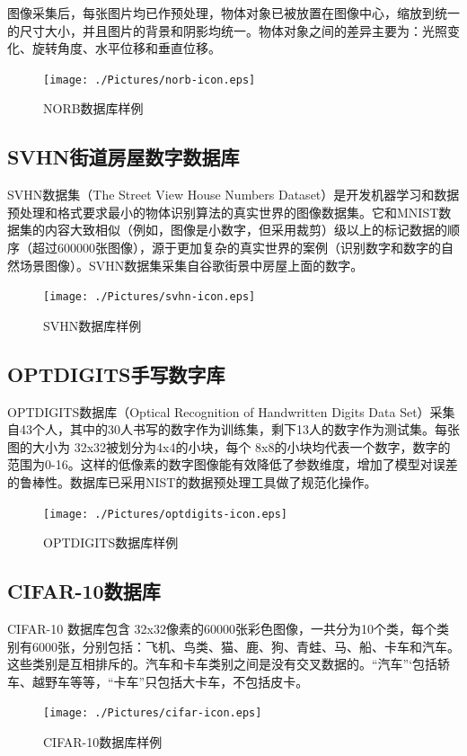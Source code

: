 \documentclass[oneside]{ZJUthesis}
\begin{document}
图像采集后，每张图片均已作预处理，物体对象已被放置在图像中心，缩放到统一的尺寸大小，并且图片的背景和阴影均统一。物体对象之间的差异主要为：光照变化、旋转角度、水平位移和垂直位移。
\begin{figure}[h]
\centering
\texttt{[image: ./Pictures/norb-icon.eps]}
\caption{NORB数据库样例\label{fig:norb-icon}}
\end{figure}

\subsection{SVHN街道房屋数字数据库}
SVHN数据集（The Street View House Numbers Dataset）是开发机器学习和数据预处理和格式要求最小的物体识别算法的真实世界的图像数据集\cite{netzer2011reading}。它和MNIST数据集的内容大致相似（例如，图像是小数字，但采用裁剪）级以上的标记数据的顺序（超过600000张图像），源于更加复杂的真实世界的案例（识别数字和数字的自然场景图像）。SVHN数据集采集自谷歌街景中房屋上面的数字。
\begin{figure}[h]
\centering
\texttt{[image: ./Pictures/svhn-icon.eps]}
\caption{SVHN数据库样例\label{fig:svhn-icon}}
\end{figure}


\subsection{OPTDIGITS手写数字库}
OPTDIGITS数据库（Optical Recognition of Handwritten Digits Data Set）采集自43个人，其中的30人书写的数字作为训练集，剩下13人的数字作为测试集\cite{Bache+Lichman:2013}。每张图的大小为 32x32被划分为4x4的小块，每个 8x8的小块均代表一个数字，数字的范围为0-16。这样的低像素的数字图像能有效降低了参数维度，增加了模型对误差的鲁棒性。数据库已采用NIST的数据预处理工具做了规范化操作。
\begin{figure}[h]
\centering
\texttt{[image: ./Pictures/optdigits-icon.eps]}
\caption{OPTDIGITS数据库样例\label{fig:svhn-icon}}
\end{figure}



\subsection{CIFAR-10数据库}
CIFAR-10 数据库包含 32x32像素的60000张彩色图像，一共分为10个类，每个类别有6000张，分别包括：飞机、鸟类、猫、鹿、狗、青蛙、马、船、卡车和汽车\cite{krizhevsky2009learning}。这些类别是互相排斥的。汽车和卡车类别之间是没有交叉数据的。``汽车''‘包括轿车、越野车等等，``卡车''只包括大卡车，不包括皮卡。
\begin{figure}[h]
\centering
\texttt{[image: ./Pictures/cifar-icon.eps]}
\caption{CIFAR-10数据库样例\label{fig:cifar-icon}}
\end{figure}
\end{document}
